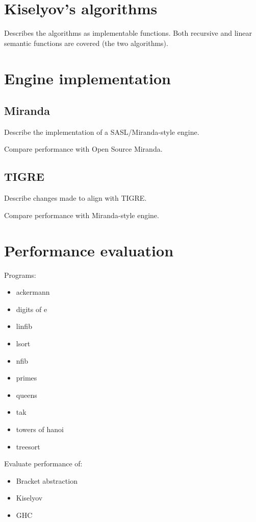 \documentclass[conference]{IEEEtran}
\begin{document}
\section{Kiselyov's algorithms}
\label{sec:kiselyov}
Describes the algorithms as implementable functions. Both recursive and linear semantic functions are covered (the two algorithms).

\section{Engine implementation}
\label{sec:engine}
\subsection*{Miranda}
Describe the implementation of a SASL/Miranda-style engine.

Compare performance with Open Source Miranda.

\subsection*{TIGRE}
Describe changes made to align with TIGRE.

Compare performance with Miranda-style engine.

\section{Performance evaluation}
\label{sec:eval}
Programs:
\begin{itemize}
    \item ackermann
    \item digits of e
    \item linfib
    \item lsort
    \item nfib
    \item primes
    \item queens
    \item tak
    \item towers of hanoi
    \item treesort
\end{itemize}

Evaluate performance of:

\begin{itemize}
    \item Bracket abstraction
    \item Kiselyov
    \item GHC
\end{itemize}
\end{document}
